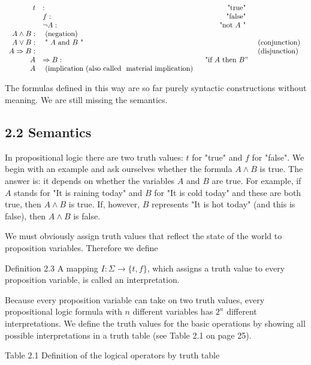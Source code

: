\documentclass[10pt]{article}
\begin{document}
$$
\begin{array}{rlrl}
t & : & \text { "true" } & \\
& f: & \text { "false" } & \\
& \neg A: & \text { "not } A \text { " } & \\
A \wedge B: & \text { (negation) } \\
A \vee B: & \text { " } A \text { and } B \text { " } & & \text { (conjunction) } \\
A \Rightarrow B: & & & \text { (disjunction) } \\
A & \Rightarrow B: & \text { "if } A \text { then } B " & \\
A & \text { (implication (also called } \text { material implication) }
\end{array}
$$

The formulas defined in this way are so far purely syntactic constructions without meaning. We are still missing the semantics.

\subsection*{2.2 Semantics}
In propositional logic there are two truth values: $t$ for "true" and $f$ for "false". We begin with an example and ask ourselves whether the formula $A \wedge B$ is true. The answer is: it depends on whether the variables $A$ and $B$ are true. For example, if $A$ stands for "It is raining today" and $B$ for "It is cold today" and these are both true, then $A \wedge B$ is true. If, however, $B$ represents "It is hot today" (and this is false), then $A \wedge B$ is false.

We must obviously assign truth values that reflect the state of the world to proposition variables. Therefore we define

\begin{displayquote}
Definition 2.3 A mapping $I: \Sigma \rightarrow\{t, f\}$, which assigns a truth value to every proposition variable, is called an interpretation.
\end{displayquote}

Because every proposition variable can take on two truth values, every propositional logic formula with $n$ different variables has $2^{n}$ different interpretations. We define the truth values for the basic operations by showing all possible interpretations in a truth table (see Table 2.1 on page 25).

Table 2.1 Definition of the logical operators by truth table
\end{document}
